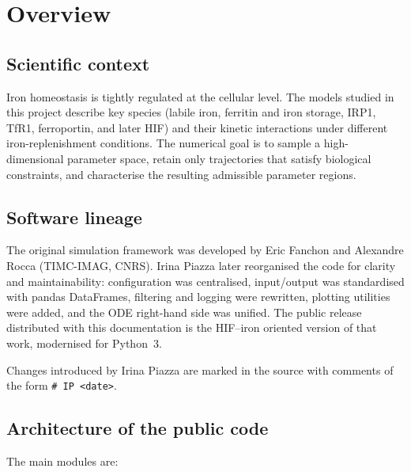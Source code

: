 \chapter{Overview}

\section{Scientific context}
Iron homeostasis is tightly regulated at the cellular level. The models studied
in this project describe key species (labile iron, ferritin and iron storage,
IRP1, TfR1, ferroportin, and later HIF) and their kinetic interactions under
different iron-replenishment conditions. The numerical goal is to sample a
high-dimensional parameter space, retain only trajectories that satisfy
biological constraints, and characterise the resulting admissible parameter
regions.

\section{Software lineage}
The original simulation framework was developed by Eric Fanchon and Alexandre
Rocca (TIMC-IMAG, CNRS). Irina Piazza later reorganised the code for clarity and
maintainability: configuration was centralised, input/output was standardised
with pandas DataFrames, filtering and logging were rewritten, plotting utilities
were added, and the ODE right-hand side was unified. The public release
distributed with this documentation is the HIF--iron oriented version of that
work, modernised for Python~3.

Changes introduced by Irina Piazza are marked in the source with comments of the
form \texttt{\# IP <date>}.

\section{Architecture of the public code}
The main modules are:

